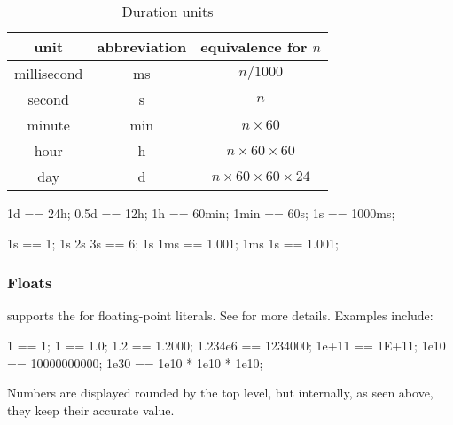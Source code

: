 \begin{table}
  \centering
  \begin{tabular}{|c|c|c|}
    \hline
    unit        & abbreviation & equivalence for $n$  \\
    \hline
    millisecond & ms           & $n / 1000$         \\
    second      & s            & $n$                \\
    minute      & min          & $n \times 60$           \\
    hour        & h            & $n \times 60 \times 60$      \\
    day         & d            & $n \times 60 \times 60 \times 24$ \\
    \hline
  \end{tabular}
  \caption{Duration units}
  \label{tab:duration}
\end{table}

\begin{urbiassert}
1d   == 24h;
0.5d == 12h;
1h   == 60min;
1min == 60s;
1s   == 1000ms;


1s == 1;
1s 2s 3s == 6;
1s 1ms == 1.001;
1ms 1s == 1.001;
\end{urbiassert}

\subsubsection{Floats}
\label{sec:us-syn-lit-float}

\us supports the  for floating-point
literals.  See  for more details.  Examples include:


\begin{urbiassert}
            1 == 1;
            1 == 1.0;
          1.2 == 1.2000;
      1.234e6 == 1234000;
        1e+11 == 1E+11;
         1e10 == 10000000000;
         1e30 == 1e10 * 1e10 * 1e10;
\end{urbiassert}

Numbers are displayed rounded by the top level, but internally, as
seen above, they keep their accurate value.

